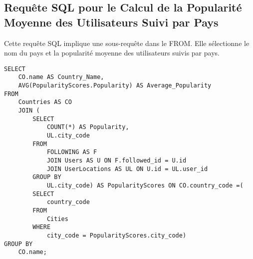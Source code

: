 \subsection{Requête SQL pour le Calcul de la Popularité Moyenne des Utilisateurs Suivi par Pays}

Cette requête SQL implique une sous-requête dans le FROM. Elle sélectionne le nom du pays et la popularité moyenne des utilisateurs suivis par pays.
\begin{lstlisting}
SELECT
    CO.name AS Country_Name,
    AVG(PopularityScores.Popularity) AS Average_Popularity
FROM
    Countries AS CO
    JOIN (
        SELECT
            COUNT(*) AS Popularity,
            UL.city_code
        FROM
            FOLLOWING AS F
            JOIN Users AS U ON F.followed_id = U.id
            JOIN UserLocations AS UL ON U.id = UL.user_id
        GROUP BY
            UL.city_code) AS PopularityScores ON CO.country_code =(
        SELECT
            country_code
        FROM
            Cities
        WHERE
            city_code = PopularityScores.city_code)
GROUP BY
    CO.name;
\end{lstlisting}